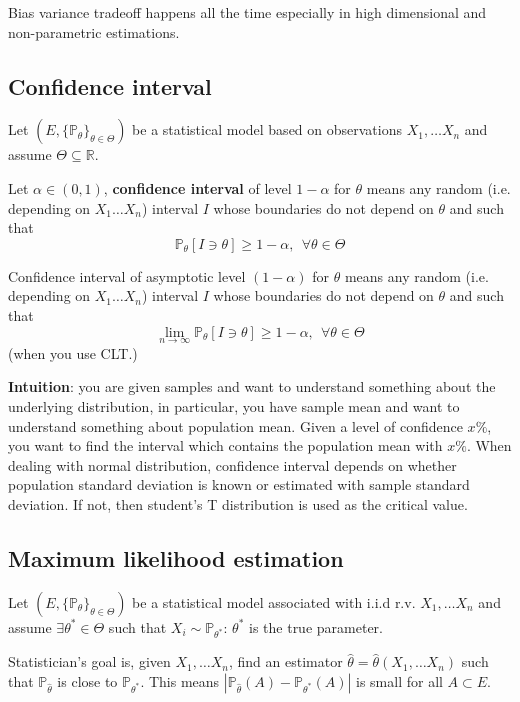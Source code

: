 \documentclass{article}
\begin{document}
Bias variance tradeoff happens all the time especially in high dimensional and non-parametric estimations.

\subsection{Confidence interval}

Let $(E, \{\mathbb{P_{\theta}}\}_{\theta \in \Theta})$ be a statistical model based on observations $X_1, \dots X_n$ and assume $\Theta \subseteq \mathbb{R}$.

Let $\alpha \in (0, 1)$, \textbf{confidence interval} of level $1 - \alpha$ for $\theta$ means any random (i.e. depending on $X_1 \dots X_n$) interval $\mathit{I}$ whose boundaries do not depend on $\theta$ and such that
$$
\mathbb{P}_{\theta}[\mathit{I} \ni \theta] \geq 1 - \alpha, ~ ~ \forall \theta \in \Theta
$$

Confidence interval of asymptotic level $(1 - \alpha)$ for $\theta$ means any random (i.e. depending on $X_1 \dots X_n$) interval $\mathit{I}$ whose boundaries do not depend on $\theta$ and such that
$$
\lim_{n \to \infty} \mathbb{P}_{\theta}[\mathit{I} \ni \theta] \geq 1 - \alpha, ~ ~ \forall \theta \in \Theta
$$
(when you use CLT.)

\textbf{Intuition}: you are given samples and want to understand something about the underlying distribution, in particular, you have sample mean and want to understand something about population mean.
Given a level of confidence $x\%$, you want to find the interval which contains the population mean with $x\%$.
When dealing with normal distribution, confidence interval depends on whether population standard deviation is known or estimated with sample standard deviation. If not, then student's T distribution is used as the critical value.

\subsection{Maximum likelihood estimation}
\label{chap:mle}

Let $(E, \{\mathbb{P_{\theta}}\}_{\theta \in \Theta})$ be a statistical model associated with i.i.d r.v. $X_1, \dots X_n$ and assume $\exists \theta^* \in \Theta$ such that $X_i \sim \mathbb{P}_{\theta^*}$: $\theta^*$ is the true parameter.

Statistician's goal is, given $X_1, \dots X_n$, find an estimator $\hat{\theta} = \hat{\theta}(X_1, \dots X_n)$ such that $\mathbb{P}_{\hat{\theta}}$ is close to $\mathbb{P}_{\theta^*}$. This means
$|\mathbb{P}_{\hat{\theta}}(A) - \mathbb{P}_{\theta^*}(A)|$ is small for all $A \subset E$.
\end{document}

